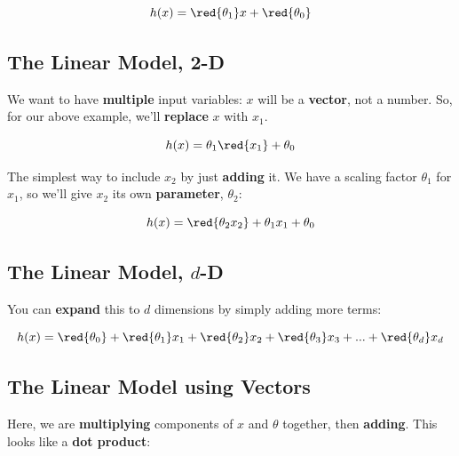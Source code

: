         \begin{equation}
            h(x) = \red{\theta_1} x + \red{\theta_0}
        \end{equation}
        
    \subsection{The Linear Model, 2-D}
    
        We want to have \textbf{multiple} input variables: $x$ will be a \textbf{vector}, not a number. So, for our above example, we'll \textbf{replace} $x$ with $x_1$.
        
        \begin{equation}
            h(x) = \theta_1 \red{x_1} + \theta_0
        \end{equation}
        
        The simplest way to include $x_2$ by just \textbf{adding} it. We have a scaling factor $\theta_1$ for $x_1$, so we'll give $x_2$ its own \textbf{parameter}, $\theta_2$:
        
        \begin{equation}
            h(x) = \red{\theta_2 x_2} + \theta_1 x_1 + \theta_0
        \end{equation}
        
    \subsection{The Linear Model, $d$-D}
    
        You can \textbf{expand} this to $d$ dimensions by simply adding more terms:
        
        \begin{equation}
            h(x) = \red{\theta_0} + \red{\theta_1}x_1 + \red{\theta_2}x_2 + \red{\theta_3}x_3 + ... + \red{\theta_d}x_d
        \end{equation}
        
    \subsection{The Linear Model using Vectors}
        
        Here, we are \textbf{multiplying} components of $x$ and $\theta$ together, then \textbf{adding}. This looks like a \textbf{dot product}:
        
